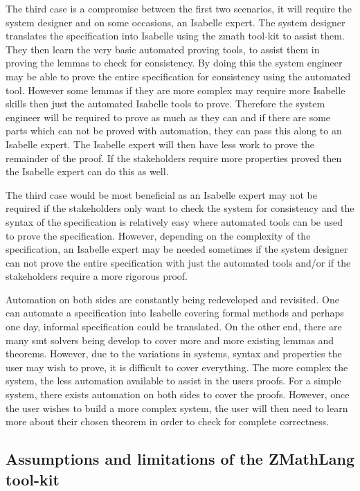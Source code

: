 The third case is a compromise between the first two scenarios, it will require
the system designer and on some occasions, an Isabelle expert. The system
designer translates the specification into Isabelle using the \gls{zmath}
tool-kit to assist them. They then learn the very basic automated proving tools,
to assist them in proving the lemmas to check for consistency. By doing this the
system engineer may be able to prove the entire specification for consistency
using the automated tool. However some lemmas if they are more complex may
require more Isabelle skills then just the automated Isabelle tools to prove.
Therefore the system engineer will be required to prove as much as they can and
if there are some parts which can not be proved with automation, they can pass
this along to an Isabelle expert. The Isabelle expert will then have less work
to prove the remainder of the proof. If the stakeholders require more properties
proved then the Isabelle expert can do this as well.

The third case would be most beneficial as an Isabelle expert may not be
required if the stakeholders only want to check the system for consistency and
the syntax of the specification is relatively easy where automated tools can be
used to prove the specification. However, depending on the complexity of the
specification, an Isabelle expert may be needed sometimes if the system designer
can not prove the entire specification with just the automated tools and/or if
the stakeholders require a more rigorous proof.

Automation on both sides are constantly being redeveloped and revisited. One can
automate a specification into Isabelle covering formal methods and perhaps one
day, informal specification could be translated. On the other end, there are
many \gls{smt} solvers being develop to cover more and more existing lemmas and
theorems. However, due to the variations in systems, syntax and properties the
user may wish to prove, it is difficult to cover everything. The more complex
the system, the less automation available to assist in the users proofs. For a
simple system, there exists automation on both sides to cover the proofs.
However, once the user wishes to build a more complex system, the user will then
need to learn more about their chosen theorem in order to check for complete
correctness.

\subsection{Assumptions and limitations of the ZMathLang tool-kit}

